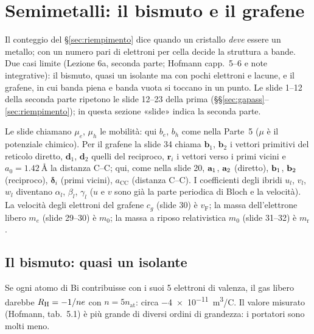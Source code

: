 \documentclass[11pt,a4paper]{article}
\begin{document}
\section{Semimetalli: il bismuto e il grafene}\label{sec:semimetalli}
Il conteggio del §\ref{sec:riempimento} dice quando un cristallo \emph{deve} essere un metallo; con un numero pari di elettroni per cella decide la
struttura a bande. Due casi limite (Lezione 6a, seconda parte; Hofmann capp.~5--6 e note integrative): il bismuto, quasi un isolante ma con pochi
elettroni e lacune, e il grafene, in cui banda piena e banda vuota si toccano in un punto. Le slide 1--12 della seconda parte ripetono le slide 12--23
della prima (§§\ref{sec:gapass}--\ref{sec:riempimento}); in questa sezione «slide» indica la seconda parte.

\begin{osservazione}[notazione]
Le slide chiamano $\mu_e$, $\mu_h$ le mobilità: qui $b_e$, $b_h$ come nella Parte~5 ($\mu$ è il potenziale chimico). Per il grafene la slide 34
chiama $\mathbf b_1$, $\mathbf b_2$ i vettori primitivi del reticolo diretto, $\mathbf d_1$, $\mathbf d_2$ quelli del reciproco, $\mathbf r_i$ i vettori
verso i primi vicini e $a_0=\SI{1.42}{\angstrom}$ la distanza C--C; qui, come nella slide 20, $\mathbf a_1$, $\mathbf a_2$ (diretto), $\mathbf b_1$, $\mathbf b_2$
(reciproco), $\bm\delta_i$ (primi vicini), $a_{\mathrm{CC}}$ (distanza C--C). I coefficienti degli ibridi $u_l$, $v_l$, $w_l$ diventano $\alpha_l$, $\beta_l$,
$\gamma_l$ ($u$ e $v$ sono già la parte periodica di Bloch e la velocità). La velocità degli elettroni del grafene $c_g$ (slide 30) è $v_{\mathrm F}$;
la massa dell'elettrone libero $m_e$ (slide 29--30) è $m_0$; la massa a riposo relativistica $m_0$ (slide 31--32) è $m_{\mathrm r}$.
\end{osservazione}

\subsection{Il bismuto: quasi un isolante}\label{sec:bismuto}
Se ogni atomo di Bi contribuisse con i suoi 5 elettroni di valenza, il gas libero darebbe $R_{\mathrm H}=-1/ne$ con $n=5n_{\mathrm{at}}$: circa
\SI{-4e-11}{m^3/C}. Il valore misurato (Hofmann, tab.~5.1) è più grande di diversi ordini di grandezza: i portatori sono molti meno.
\end{document}
